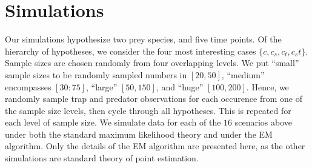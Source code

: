\section*{Simulations}
\label{sec:sim}

Our simulations hypothesize two prey species, and five time points.  Of the hierarchy of hypotheses, we consider the four most interesting cases $\{c, c_s, c_t, c_st\}$.  Sample sizes are chosen randomly from four overlapping levels.  We put ``small'' sample sizes to be randomly sampled numbers in $[20,50]$, ``medium'' encompasses $[30:75]$, ``large'' $[50,150]$, and ``huge'' $[100,200]$.  Hence, we randomly sample trap and predator observations for each occurence from one of the sample size levels, then cycle through all hypotheses.  This is repeated for each level of sample size.  We simulate data for each of the $16$ scenarios above under both the standard maximum likelihood theory and under the EM algorithm.  Only the details of the EM algorithm are presented here, as the other simulations are standard theory of point estimation.  










